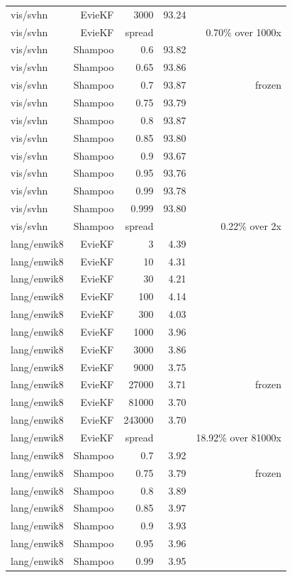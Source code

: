 \begin{table}[t]
\begin{tabular}{lrrrr}
vis/svhn & EvieKF & 3000 & 93.24 &  \\
vis/svhn & EvieKF & spread &  & 0.70\% over 1000x \\
vis/svhn & Shampoo & 0.6 & 93.82 &  \\
vis/svhn & Shampoo & 0.65 & 93.86 &  \\
vis/svhn & Shampoo & 0.7 & 93.87 & frozen \\
vis/svhn & Shampoo & 0.75 & 93.79 &  \\
vis/svhn & Shampoo & 0.8 & 93.87 &  \\
vis/svhn & Shampoo & 0.85 & 93.80 &  \\
vis/svhn & Shampoo & 0.9 & 93.67 &  \\
vis/svhn & Shampoo & 0.95 & 93.76 &  \\
vis/svhn & Shampoo & 0.99 & 93.78 &  \\
vis/svhn & Shampoo & 0.999 & 93.80 &  \\
vis/svhn & Shampoo & spread &  & 0.22\% over 2x \\
lang/enwik8 & EvieKF & 3 & 4.39 &  \\
lang/enwik8 & EvieKF & 10 & 4.31 &  \\
lang/enwik8 & EvieKF & 30 & 4.21 &  \\
lang/enwik8 & EvieKF & 100 & 4.14 &  \\
lang/enwik8 & EvieKF & 300 & 4.03 &  \\
lang/enwik8 & EvieKF & 1000 & 3.96 &  \\
lang/enwik8 & EvieKF & 3000 & 3.86 &  \\
lang/enwik8 & EvieKF & 9000 & 3.75 &  \\
lang/enwik8 & EvieKF & 27000 & 3.71 & frozen \\
lang/enwik8 & EvieKF & 81000 & 3.70 &  \\
lang/enwik8 & EvieKF & 243000 & 3.70 &  \\
lang/enwik8 & EvieKF & spread &  & 18.92\% over 81000x \\
lang/enwik8 & Shampoo & 0.7 & 3.92 &  \\
lang/enwik8 & Shampoo & 0.75 & 3.79 & frozen \\
lang/enwik8 & Shampoo & 0.8 & 3.89 &  \\
lang/enwik8 & Shampoo & 0.85 & 3.97 &  \\
lang/enwik8 & Shampoo & 0.9 & 3.93 &  \\
lang/enwik8 & Shampoo & 0.95 & 3.96 &  \\
lang/enwik8 & Shampoo & 0.99 & 3.95 &  \\

\end{tabular}
\end{table}
